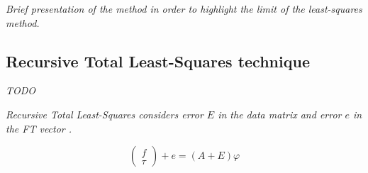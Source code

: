 \documentclass[/home/francois/latex/report/main.tex]{subfiles}
\begin{document}
{\it
Brief presentation of the method in order to highlight the limit of the least-squares method.
}

\subsection{Recursive Total Least-Squares technique}

\textit{TODO}

{\it
Recursive Total Least-Squares considers error $E$ in the data matrix and error $e$ in the \ac{FT} vector \cite{Kubus2008}
.

\begin{equation}
 \begin{pmatrix}
  f    \\
  \tau
 \end{pmatrix} + e
 = (A + E) \varphi
\end{equation}
}
\end{document}

